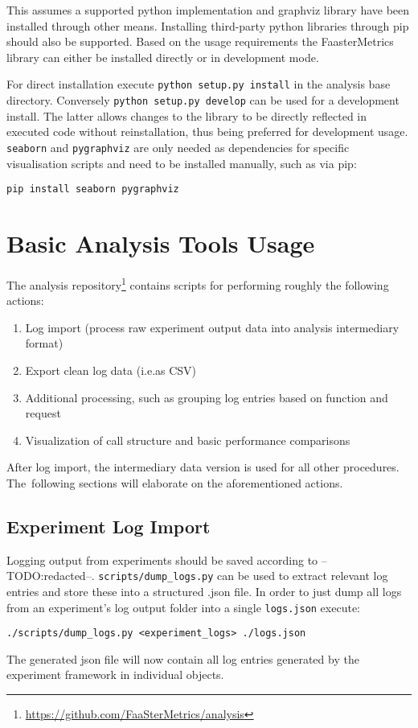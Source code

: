 \documentclass[../main.tex]{subfiles}
\begin{document}
This assumes a supported python implementation and graphviz library have been installed through other means. 
Installing third-party python libraries through pip should also be supported. 
Based on the usage requirements the FaasterMetrics library can either be installed directly or in development mode. 

For direct installation execute \texttt{python setup.py install} in the analysis base directory. 
Conversely \texttt{python setup.py develop} can be used for a development install. 
The latter allows changes to the library to be directly reflected in executed code without reinstallation,
thus being preferred for development usage.
\texttt{seaborn} and \texttt{pygraphviz} are only needed as dependencies for specific visualisation scripts 
and need to be installed manually, such as via pip:
\begin{tcolorbox}
  \texttt{pip install seaborn pygraphviz}
\end{tcolorbox}

\section{Basic Analysis Tools Usage}

The analysis repository\footnote{\url{https://github.com/FaaSterMetrics/analysis}}
contains scripts for performing roughly the following actions:
\begin{enumerate}
  \item Log import (process raw experiment output data into analysis intermediary format)
  \item Export clean log data (i.e.\@ as CSV)
  \item Additional processing, such as grouping log entries based on function and request
  \item Visualization of call structure and basic performance comparisons
\end{enumerate}
After log import, the intermediary data version is used for all other procedures. 
The~following sections will elaborate on the aforementioned actions.

\subsection{Experiment Log Import}%
\label{sub:analysisUsageLogImport}

Logging output from experiments should be saved according to --TODO:\@ redacted--.
\texttt{scripts/dump\_logs.py} can be used to extract relevant log entries and store these into a structured .json file.
In order to just dump all logs from an experiment's log output folder into a single \texttt{logs.json} execute:
\begin{tcolorbox}
  \texttt{./scripts/dump_logs.py <experiment_logs> ./logs.json}
\end{tcolorbox}\noindent
The generated json file will now contain all log entries generated by the experiment framework in individual objects.
\end{document}
